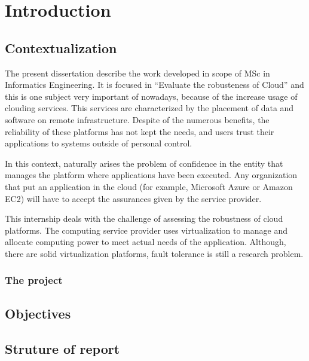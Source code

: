 \section{Introduction}

\subsection{Contextualization}
The present dissertation describe the work developed in scope of MSc in Informatics Engineering. It is focused in ``Evaluate the robusteness of Cloud'' and this is one subject very important of nowadays, because of the increase usage of clouding services.
This services are characterized by the placement of data and software on remote infrastructure. Despite of the numerous benefits, the reliability of these platforms has not kept the needs, and users trust their applications to systems outside of personal control. 

In this context, naturally arises the problem of confidence in the entity that manages the platform where applications have been executed. Any organization that put an application in the cloud (for example, Microsoft Azure or Amazon EC2) will have to accept the assurances given by the service provider.

This internship deals with the challenge of assessing the robustness of cloud platforms. The computing service provider uses virtualization to manage and allocate computing power to meet actual needs of the application. Although, there are solid virtualization platforms, fault tolerance is still a research problem.


\subsubsection{The project}

\subsection{Objectives}

\subsection{Struture of report}


